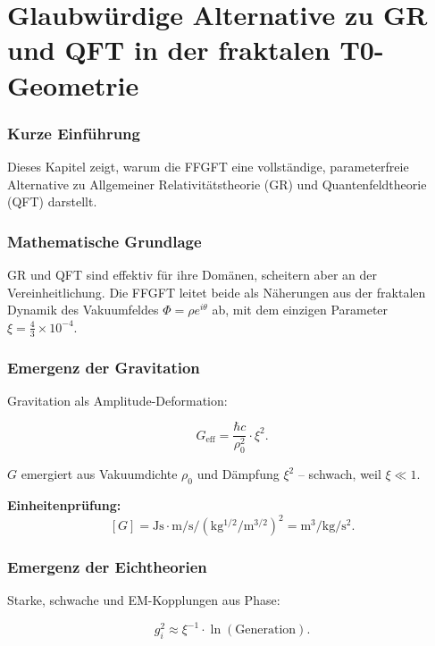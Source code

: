 \chapter{Glaubwürdige Alternative zu GR und QFT in der fraktalen T0-Geometrie}


	
	\subsection*{Kurze Einführung}
	
	Dieses Kapitel zeigt, warum die FFGFT eine vollständige, parameterfreie Alternative zu Allgemeiner Relativitätstheorie (GR) und Quantenfeldtheorie (QFT) darstellt.
	
	\subsection*{Mathematische Grundlage}
	
	GR und QFT sind effektiv für ihre Domänen, scheitern aber an der Vereinheitlichung. Die FFGFT leitet beide als Näherungen aus der fraktalen Dynamik des Vakuumfeldes \(\Phi = \rho e^{i\theta}\) ab, mit dem einzigen Parameter \(\xi = \frac{4}{3} \times 10^{-4}\).
	
	\subsection*{Emergenz der Gravitation}
	
	Gravitation als Amplitude-Deformation:
	
	\begin{equation}
		G_{\text{eff}} = \frac{\hbar c}{ \rho_0^2 } \cdot \xi^2.
	\end{equation}
	
	\(G\) emergiert aus Vakuumdichte \(\rho_0\) und Dämpfung \(\xi^2\) – schwach, weil \(\xi \ll 1\).
	
	\textbf{Einheitenprüfung:}
	\[
	[G] = \si{\joule\second} \cdot \si{\meter\per\second}
	/ \left( \si{\kilo\gram^{1/2}\per\meter^{3/2}} \right)^2
	= \si{\meter\cubed\per\kilo\gram\per\second\squared}.
	\]
	
	\subsection*{Emergenz der Eichtheorien}
	
	Starke, schwache und EM-Kopplungen aus Phase:
	
	\begin{equation}
		g_i^2 \approx \xi^{-1} \cdot \ln(\text{Generation}).
	\end{equation}
	
